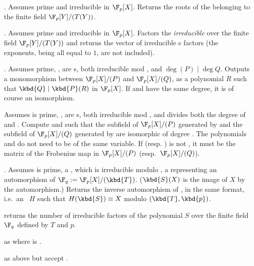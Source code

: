 . Assumes  prime
and  irreducible in $\F_p[X]$. Returns the roots of the 
 belonging to the finite field $\F_p[Y]/(T(Y))$.

. Assumes  prime
and  irreducible in $\F_p[X]$. Factors the \emph{irreducible}
  over the finite field $\F_p[Y]/(T(Y))$ and returns the
vector of irreducible s factors (the exponents, being all equal to
$1$, are not included).

. Assumes  prime,
,  are s, both irreducible mod , and
$\deg(P) \mid \deg Q$. Outputs a monomorphism between $\F_p[X]/(P)$ and
$\F_p[X]/(Q)$, as a polynomial $R$ such that $\kbd{Q} \mid \kbd{P}(R)$ in
$\F_p[X]$. If  and  have the same degree, it is of course an
isomorphism.

\hfil\break
Assumes  is prime, ,  are s, both
irreducible mod , and  divides both the degree of  and
. Compute  and  such that the subfield of
$\F_p[X]/(P)$ generated by  and the subfield of $\F_p[X]/(Q)$
generated by  are isomorphic of degree . The polynomials
 and  do not need to be of the same variable. If 
(resp. ) is not , it must be the matrix of the Frobenius
map in $\F_p[X]/(P)$ (resp.~$\F_p[X]/(Q)$).

. Assumes  is prime,
 a , which is irreducible modulo ,  a
 representing an automorphism of $\F_q := \F_p[X]/(\kbd{T})$.
($\kbd{S}(X)$ is the image of $X$ by the automorphism.) Returns the
inverse automorphism of , in the same format, i.e.~an ~$H$
such that $H(\kbd{S}) \equiv X$ modulo $(\kbd{T}, \kbd{p})$.

 returns the number of
irreducible factors of the polynomial $S$ over the finite field $\F_q$
defined by $T$ and $p$.

 as
 where  is .

 as above but accept .

